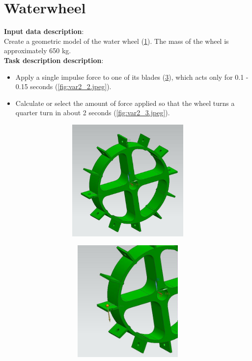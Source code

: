 \documentclass[12pt]{article}
\newcommand\ttask[3] 
 {
	\section*{#1}
	\textbf{Input data description}: \\ #2 \  \\
	\textbf{Task description description}: #3
	\newpage
 }
\begin{document}
\ttask{Waterwheel}{
	Create a geometric model of the water wheel (\cref{fig:var2_0.jpeg}). The mass of the wheel is approximately 650 kg.
}{
	\begin{itemize}
		\item Apply a single impulse force to one of its blades (\cref{fig:var2_1.jpeg}), which acts only for 0.1 - 0.15 seconds (\cref{fig:var2_2.jpeg}).
		\item Calculate or select the amount of force applied so that the wheel turns a quarter turn in about 2 seconds (\cref{fig:var2_3.jpeg}).
	\end{itemize}

	\begin{figure}[H]
		\begin{subfigure}{0.49\textwidth}
			\centering\includegraphics[height=6cm,width=1\textwidth,keepaspectratio]{var2_0.jpeg}
			\caption{}
			\label{fig:var2_0.jpeg}
		\end{subfigure}
		\begin{subfigure}{0.49\textwidth}
			\centering\includegraphics[height=6cm,width=1\textwidth,keepaspectratio]{var2_1.jpeg}
			\caption{}
			\label{fig:var2_1.jpeg}
		\end{subfigure}
	

\end{figure}}
\end{document}
